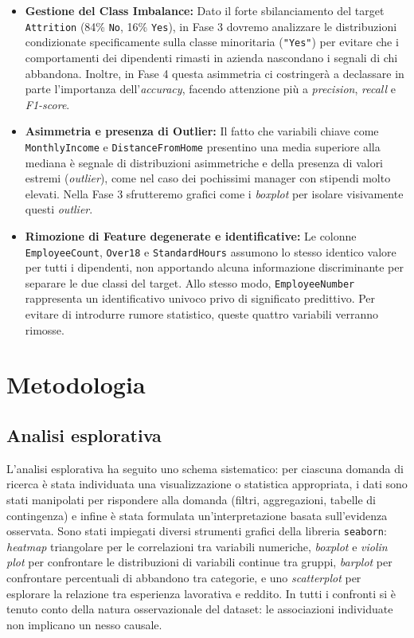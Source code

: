 \documentclass{article}
\begin{document}
\begin{itemize}
    \item \textbf{Gestione del Class Imbalance:} Dato il forte sbilanciamento del target \texttt{Attrition} (84\% \texttt{No}, 16\% \texttt{Yes}), in Fase 3 dovremo analizzare le distribuzioni condizionate specificamente sulla classe minoritaria (\texttt{"Yes"}) per evitare che i comportamenti dei dipendenti rimasti in azienda nascondano i segnali di chi abbandona. Inoltre, in Fase 4 questa asimmetria ci costringerà a declassare in parte l'importanza dell'\textit{accuracy}, facendo attenzione più a \textit{precision}, \textit{recall} e \textit{F1-score}.
    
    \item \textbf{Asimmetria e presenza di Outlier:} Il fatto che variabili chiave come \texttt{MonthlyIncome} e \texttt{DistanceFromHome} presentino una media superiore alla mediana è segnale di distribuzioni asimmetriche e della presenza di valori estremi (\textit{outlier}), come nel caso dei pochissimi manager con stipendi molto elevati. Nella Fase 3 sfrutteremo grafici come i \textit{boxplot} per isolare visivamente questi \textit{outlier}.
    
    \item \textbf{Rimozione di Feature degenerate e identificative:} Le colonne \texttt{EmployeeCount}, \texttt{Over18} e \texttt{StandardHours} assumono lo stesso identico valore per tutti i dipendenti, non apportando alcuna informazione discriminante per separare le due classi del target. Allo stesso modo, \texttt{EmployeeNumber} rappresenta un identificativo univoco privo di significato predittivo. Per evitare di introdurre rumore statistico, queste quattro variabili verranno rimosse.
\end{itemize}


\section{Metodologia}
\label{sec:metodologia}

\subsection{Analisi esplorativa}
\label{sec:metodologia-eda}

L'analisi esplorativa ha seguito uno schema sistematico: per ciascuna domanda di ricerca è stata individuata una visualizzazione o statistica appropriata, i dati sono stati manipolati per rispondere alla domanda (filtri, aggregazioni, tabelle di contingenza) e infine è stata formulata un'interpretazione basata sull'evidenza osservata. Sono stati impiegati diversi strumenti grafici della libreria \texttt{seaborn}: \emph{heatmap} triangolare per le correlazioni tra variabili numeriche, \emph{boxplot} e \emph{violin plot} per confrontare le distribuzioni di variabili continue tra gruppi, \emph{barplot} per confrontare percentuali di abbandono tra categorie, e uno \emph{scatterplot} per esplorare la relazione tra esperienza lavorativa e reddito. In tutti i confronti si è tenuto conto della natura osservazionale del dataset: le associazioni individuate non implicano un nesso causale.
\end{document}
